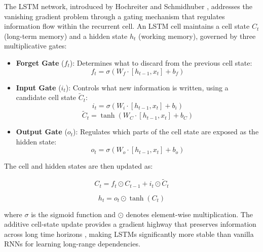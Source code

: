 The LSTM network, introduced by Hochreiter and Schmidhuber
\cite{hochreiter1997long, graves2012supervised}, addresses the vanishing gradient
problem through a gating mechanism that regulates information flow within the recurrent
cell. An LSTM cell maintains a cell state $C_t$ (long-term memory) and a hidden state
$h_t$ (working memory), governed by three multiplicative gates:

\begin{itemize}
    \item \textbf{Forget Gate} ($f_t$): Determines what to discard from the previous
    cell state:
    \begin{equation}
        f_t = \sigma(W_f \cdot [h_{t-1}, x_t] + b_f)
        \label{eq:forget_gate}
    \end{equation}

    \item \textbf{Input Gate} ($i_t$): Controls what new information is written, using
    a candidate cell state $\tilde{C}_t$:
    \begin{equation}
        i_t = \sigma(W_i \cdot [h_{t-1}, x_t] + b_i)
        \label{eq:input_gate}
    \end{equation}
    \begin{equation}
        \tilde{C}_t = \tanh(W_C \cdot [h_{t-1}, x_t] + b_C)
        \label{eq:candidate_cell}
    \end{equation}

    \item \textbf{Output Gate} ($o_t$): Regulates which parts of the cell state are
    exposed as the hidden state:
    \begin{equation}
        o_t = \sigma(W_o \cdot [h_{t-1}, x_t] + b_o)
        \label{eq:output_gate}
    \end{equation}
\end{itemize}

\noindent The cell and hidden states are then updated as:

\begin{equation}
    C_t = f_t \odot C_{t-1} + i_t \odot \tilde{C}_t
    \label{eq:cell_state}
\end{equation}

\begin{equation}
    h_t = o_t \odot \tanh(C_t)
    \label{eq:hidden_state}
\end{equation}

\noindent where $\sigma$ is the sigmoid function and $\odot$ denotes element-wise
multiplication. The additive cell-state update provides a gradient highway that
preserves information across long time horizons \cite{gers2000learning}, making LSTMs
significantly more stable than vanilla RNNs for learning long-range dependencies.

